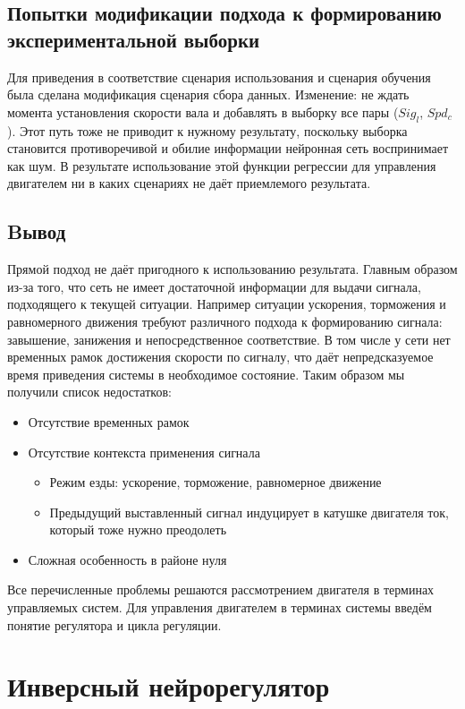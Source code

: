 \documentclass[14pt]{extreport}
\begin{document}
            \section{Попытки модификации подхода к формированию экспериментальной выборки}
                Для приведения в соответствие сценария использования и сценария обучения была сделана модификация сценария сбора данных. Изменение: не ждать момента установления скорости вала и добавлять в выборку все пары ($Sig_l$, $Spd_c$). Этот путь тоже не приводит к нужному результату, поскольку выборка становится противоречивой и обилие информации нейронная сеть воспринимает как шум. В результате использование этой функции регрессии для управления двигателем ни в каких сценариях не даёт приемлемого результата.
            \section{Bывод}
                Прямой подход не даёт пригодного к использованию результата. Главным образом из-за того, что сеть не имеет достаточной информации для выдачи сигнала, подходящего к текущей ситуации. Например ситуации ускорения, торможения и равномерного движения требуют различного подхода к формированию сигнала: завышение, занижения и непосредственное соответствие. В том числе у сети нет временных рамок достижения скорости по сигналу, что даёт непредсказуемое время приведения системы в необходимое состояние. Таким образом мы получили список недостатков:
                \begin{itemize}
                  \item Отсутствие временных рамок
                  \item Отсутствие контекста применения сигнала
                      \begin{itemize}
                        \item Режим езды: ускорение, торможение, равномерное движение
                        \item Предыдущий выставленный сигнал индуцирует в катушке двигателя ток, который тоже нужно преодолеть
                      \end{itemize}
                  \item Сложная особенность в районе нуля
                \end{itemize}
                Все перечисленные проблемы решаются рассмотрением двигателя в терминах управляемых систем. Для управления двигателем в терминах системы введём понятие регулятора и цикла регуляции.
    \chapter{Инверсный нейрорегулятор}
\end{document}

